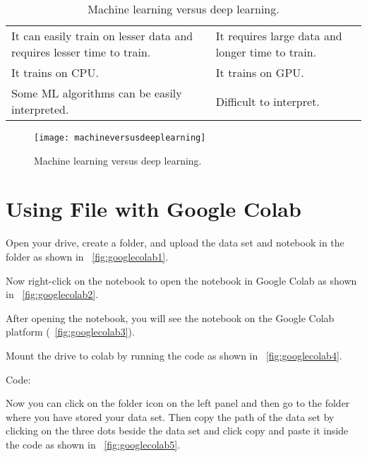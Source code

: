 	\begin{table}
        \centering
        \caption[Machine learning versus deep learning]{Machine learning versus deep learning.}
        \label{tab:machineversusdeeplearning}
		\begin{tabular}{|p{0.5\qandatextwidth-2\tabcolsep}|p{0.5\qandatextwidth-2\tabcolsep}|} \hline
				\tablecolumnheadervlinesone{Machine Learning} & \tablecolumnheadervlinestwo{Deep Learning} \\ \hline
				It can easily train on lesser data and requires lesser time to train. &
				It requires large data and longer time to train. \\ \hline
				It trains on CPU. &
				It trains on GPU. \\ \hline
				Some ML algorithms can be easily interpreted. &
				Difficult to interpret. \\ \hline%
		\end{tabular}
	\end{table}

	\begin{figure}[htb]
		\centering
		\texttt{[image: machineversusdeeplearning]}
		\caption[Machine learning versus deep learning]{Machine learning versus deep learning.}
		\label{fig:machineversusdeeplearning}
	\end{figure}


	\section{Using File with Google Colab}

	\begin{numberedlist}
		\item Open your drive, create a folder, and upload the data set and notebook in the folder as shown in \figurename~\ref{fig:googlecolab1}.
		\item Now right-click on the notebook to open the notebook in Google Colab as shown in \figurename~\ref{fig:googlecolab2}.
		\item After opening the notebook, you will see the notebook on the Google Colab platform (\figurename~\ref{fig:googlecolab3}).
		\item Mount the drive to colab by running the code as shown in \figurename~\ref{fig:googlecolab4}.
		\item Code:
		\begin{plainlist}
			\item {}
			\item {}
		\end{plainlist}
		\item Now you can click on the folder icon on the left panel and then go to the folder where you have stored your data set. Then copy the path of the data set by clicking on the three dots beside the data set and click copy and paste it inside the code as shown in \figurename~\ref{fig:googlecolab5}.
	\end{numberedlist}

